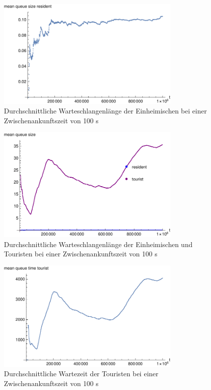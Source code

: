 \begin{figure}[htpb]
	\centering
	\includegraphics[width=0.8\textwidth]{abbildungen/1_Phone_VIP/Arrival_100_Serve_100_dur_1000000_Skip_0/MeanQueueSizeResident.pdf}
	\caption{Durchschnittliche Warteschlangenlänge der Einheimischen bei einer Zwischenankunftszeit von 100 s}
	\label{fig:1_Phone_VIP_100_MeanQueueSize_Resident}
\end{figure}

\begin{figure}[htpb]
	\centering
	\includegraphics[width=0.8\textwidth]{abbildungen/1_Phone_VIP/Arrival_100_Serve_100_dur_1000000_Skip_0/MeanQueueSizeTouristAndResident.pdf}
	\caption{Durchschnittliche Warteschlangenlänge der Einheimischen und Touristen bei einer Zwischenankunftszeit von 100 s}
	\label{fig:1_Phone_VIP_100_MeanQueueSize_All}
\end{figure}



\begin{figure}[htpb]
	\centering
	\includegraphics[width=0.8\textwidth]{abbildungen/1_Phone_VIP/Arrival_100_Serve_100_dur_1000000_Skip_0/MeanQueueTimeTourist.pdf}
	\caption{Durchschnittliche Wartezeit der Touristen bei einer Zwischenankunftszeit von 100 s}
	\label{fig:1_Phone_VIP_100_MeanQueueTime_Tourist}
\end{figure}

